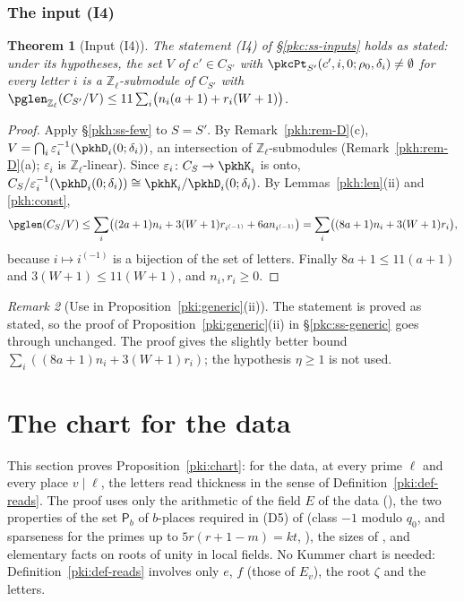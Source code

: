 \documentclass[10pt]{amsart}
\newtheorem{theorem}{Theorem}[section]
\theoremstyle{definition}
\theoremstyle{remark}
\newtheorem{remark}[theorem]{Remark}
\newcommand{\Z}{\mathbb Z}
\newcommand{\Q}{\mathbb Q}
\begin{document}
\subsubsection{The input (I4)}\label{pkh:ss-I4}

\begin{theorem}[Input (I4)]\label{pkh:I4}
The statement (I4) of \S\ref{pkc:ss-inputs} holds as stated: under its hypotheses, the set $V$ of $c'\in
C_{S'}$ with $\pkcPt_{S'}(c',i,0;\rho_0,\delta_i)\ne\emptyset$ for every letter $i$ is a $\Z_\ell$-submodule of
$C_{S'}$ with $\pglen_{\Z_\ell}(C_{S'}/V)\le11\sum_i\bigl(n_i(a+1)+r_i(W+1)\bigr)$.
\end{theorem}

\begin{proof}
Apply \S\ref{pkh:ss-few} to $S=S'$. By Remark~\ref{pkh:rem-D}(c), $V=\bigcap_i\varepsilon_i^{-1}(\pkhD_i(0;\delta_i))$,
an intersection of $\Z_\ell$-submodules (Remark~\ref{pkh:rem-D}(a); $\varepsilon_i$ is $\Z_\ell$-linear). Since
$\varepsilon_i\colon C_S\to\pkhK_i$ is onto, $C_S/\varepsilon_i^{-1}(\pkhD_i(0;\delta_i))\cong\pkhK_i/\pkhD_i(0;\delta_i)$.
By Lemmas~\ref{pkh:len}(ii) and \ref{pkh:const},
\[
\pglen(C_S/V)\le\sum_i\bigl((2a+1)n_i+3(W+1)r_{i^{(-1)}}+6an_{i^{(-1)}}\bigr)=\sum_i\bigl((8a+1)n_i+3(W+1)r_i\bigr),
\]
because $i\mapsto i^{(-1)}$ is a bijection of the set of letters. Finally $8a+1\le11(a+1)$ and $3(W+1)\le
11(W+1)$, and $n_i,r_i\ge0$.
\end{proof}

\begin{remark}[Use in Proposition~\ref{pki:generic}(ii)]\label{pkh:rem-use}
The statement is proved as stated, so the proof of Proposition~\ref{pki:generic}(ii) in \S\ref{pkc:ss-generic}
goes through unchanged. The proof gives the slightly better bound $\sum_i((8a+1)n_i+3(W+1)r_i)$; the
hypothesis $\eta\ge1$ is not used.
\end{remark}



\providecommand{\auO}{\mathcal O}
\providecommand{\auQlb}{\overline{\Q}_\ell}
\providecommand{\pkilog}{\operatorname{lg}}
\providecommand{\pkjG}{G_{\Q_\ell}}
\providecommand{\pkjcl}{\operatorname{cl}}
\providecommand{\pkjPl}{\mathsf P}
\providecommand{\pkjPb}{\mathsf P_b}

\section{The chart for the data}\label{pkj:sec}

This section proves Proposition~\ref{pki:chart}: for the data, at every prime $\ell$ and every place
$v\mid\ell$, the letters read thickness in the sense of Definition~\ref{pki:def-reads}. The proof
uses only the arithmetic of the field $E$ of the data ({\cite[\S13.1]{P46}}), the two properties of
the set $\pkjPb$ of $b$-places required in (D5) of {\cite[Definition~13.3]{P46}} (class $-1$ modulo
$q_0$, and sparseness for the primes up to $5r(r+1-m)=kt$, {\cite[Definition~13.2]{P46}}), the
sizes of {\cite[Lemma~13.4]{P46}}, and elementary facts on roots of unity in local fields. No
Kummer chart is needed: Definition~\ref{pki:def-reads} involves only $e$, $f$ (those of $E_v$), the
root $\zeta$ and the letters.
\end{document}

